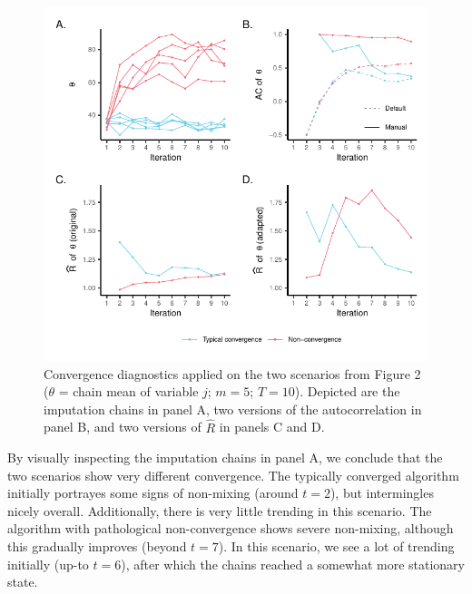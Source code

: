 \documentclass[Royal,times,sageh]{sagej}
\begin{document}
\begin{figure}

{\centering \includegraphics{2.Manuscript_files/figure-latex/diagnostics-1} 

}

\caption{Convergence diagnostics applied on the two scenarios from Figure 2 ($\theta$ = chain mean of variable $j$; $m=5$; $T=10$). Depicted are the imputation chains in panel A, two versions of the autocorrelation in panel B, and two versions of $\widehat{R}$ in panels C and D.}\label{fig:diagnostics}
\end{figure}

By visually inspecting the imputation chains in panel A, we conclude that the two scenarios show very different convergence. The typically converged algorithm initially portrayes some signs of non-mixing (around \(t=2\)), but intermingles nicely overall. Additionally, there is very little trending in this scenario. The algorithm with pathological non-convergence shows severe non-mixing, although this gradually improves (beyond \(t=7\)). In this scenario, we see a lot of trending initially (up-to \(t=6\)), after which the chains reached a somewhat more stationary state.
\end{document}
